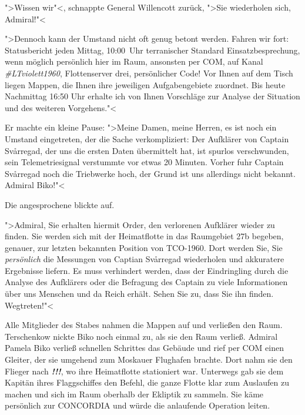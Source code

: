 \documentclass[11pt,twoside,openany]{scrbook}
\begin{document}
">Wissen wir"<, schnappte General Willencott zurück, ">Sie wiederholen sich, Admiral!"<

\begin{sloppypar}
">Dennoch kann der Umstand nicht oft genug betont werden. Fahren wir fort: Statusbericht jeden Mittag, 10:00~Uhr terranischer Standard Einsatzbesprechung, wenn möglich persönlich hier im Raum, ansonsten per COM, auf Kanal \mbox{\emph{\#LTviolett1960}}, Flottenserver drei, persönlicher Code! Vor Ihnen auf dem Tisch liegen Mappen, die Ihnen ihre jeweiligen Aufgabengebiete zuordnet. Bis heute Nachmittag 16:50 Uhr erhalte ich von Ihnen Vorschläge zur Analyse der Situation und des weiteren Vorgehens."<
\end{sloppypar}

Er machte ein kleine Pause: ">Meine Damen, meine Herren, es ist noch ein Umstand eingetreten, der die Sache verkompliziert: Der Aufklärer von Captain Svårregad, der uns die ersten Daten übermittelt hat, ist spurlos verschwunden, sein Telemetriesignal verstummte vor etwas 20 Minuten. Vorher fuhr Captain Svårregad noch die Triebwerke hoch, der Grund ist uns allerdings nicht bekannt. Admiral Biko!"<

Die angesprochene blickte auf.

">Admiral, Sie erhalten hiermit Order, den verlorenen Aufklärer wieder zu finden. Sie werden sich mit der Heimatflotte in das Raumgebiet \textsf{27b} begeben, genauer, zur letzten bekannten Position von \textsf{TCO-1960}. Dort werden Sie, Sie \emph{persönlich} die Messungen von Captian Svårregad wiederholen und akkuratere Ergebnisse liefern. Es muss verhindert werden, dass der Eindringling durch die Analyse des Aufklärers oder die Befragung des Captain zu viele Informationen über uns Menschen und da Reich erhält. Sehen Sie zu, dass Sie ihn finden. Wegtreten!"<

Alle Mitglieder des Stabes nahmen die Mappen auf und verließen den Raum. Terschenkow nickte Biko noch einmal zu, als sie den Raum verließ. Admiral Pamela Biko verließ schnellen Schrittes das Gebäude und rief per COM einen Gleiter, der sie umgehend zum Moskauer Flughafen brachte. Dort nahm sie den Flieger nach \emph{\textbf{!!!}}, wo ihre Heimatflotte stationiert war. Unterwegs gab sie dem Kapitän ihres Flaggschiffes den Befehl, die ganze Flotte klar zum Auslaufen zu machen und sich im  Raum oberhalb der Ekliptik zu sammeln. Sie käme persönlich zur \textsf{CONCORDIA} und würde die anlaufende Operation leiten.
\end{document}
